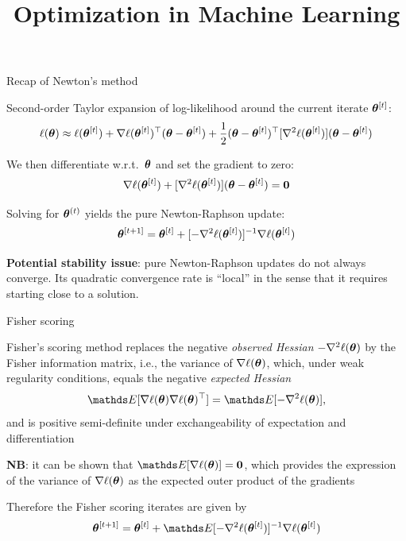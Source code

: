 \documentclass[11pt,compress,t,notes=noshow, xcolor=table]{beamer}
\title{Optimization in Machine Learning}
\begin{document}

\begin{framei}{Recap of Newton's method}
\item Second-order Taylor expansion of log-likelihood around the current iterate $\bm{\theta}^{[t]}$:
$$\ell(\bm{\theta}) \approx \ell(\bm{\theta}^{[t]}) +
\nabla\ell(\bm{\theta}^{[t]})^\top(\bm{\theta}-\bm{\theta}^{[t]}) +
\frac{1}{2}(\bm{\theta}-\bm{\theta}^{[t]})^\top[\nabla^{2}\ell(\bm{\theta}^{[t]})](\bm{\theta}-\bm{\theta}^{[t]})$$
\item We then differentiate w.r.t.~$\bm{\theta}$ and set the gradient to zero:
$$\nabla\ell(\bm{\theta}^{[t]}) + [\nabla^{2}\ell(\bm{\theta}^{[t]})](\bm{\theta}-\bm{\theta}^{[t]}) = \mathbf{0}$$
\item Solving for $\bm{\theta}^{(t)}$ yields the pure Newton-Raphson update:
$$\bm{\theta}^{[t +1]}=\bm{\theta}^{[t]} + [-\nabla^{2}\ell(\bm{\theta}^{[t]})]^{-1}\nabla\ell(\bm{\theta}^{[t]})$$
\vfill
\item \textbf{Potential stability issue}: pure Newton-Raphson updates do not always converge. Its quadratic convergence rate is ``local'' in the sense that it requires starting close to a solution.
\end{framei}


\begin{framei}{Fisher scoring}
\item Fisher's scoring method replaces the negative \textit{observed Hessian} $-\nabla^{2}\ell(\bm{\theta})$ by the Fisher information matrix, i.e., the variance of $\nabla \ell(\bm{\theta})$, which, under weak regularity conditions, equals the negative \textit{expected Hessian}
$$\E[\nabla\loglt\nabla\loglt^\top]=\E[-\nabla^{2}\loglt],$$
and is positive semi-definite under exchangeability of expectation and differentiation
\item \textbf{NB}: it can be shown that $\E[\nabla \logl(\thetav)]=\zero$, which provides the expression of the variance of $\nabla \ell(\bm{\theta})$ as the expected outer product of the gradients
\vfill
\item Therefore the Fisher scoring iterates are given by
$$\thetatn=\thetat+\E[-\nabla^{2}\logl(\thetat)]^{-1}\nabla\logl(\thetat)$$
\end{framei}
\end{document}
